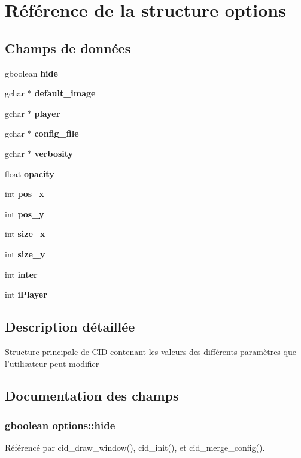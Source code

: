 \section{Référence de la structure options}
\label{structoptions}
\subsection*{Champs de données}
\begin{CompactItemize}
\item 
gboolean {\bf hide}
\item 
gchar $\ast$ {\bf default\_\-image}
\item 
gchar $\ast$ {\bf player}
\item 
gchar $\ast$ {\bf config\_\-file}
\item 
gchar $\ast$ {\bf verbosity}
\item 
float {\bf opacity}
\item 
int {\bf pos\_\-x}
\item 
int {\bf pos\_\-y}
\item 
int {\bf size\_\-x}
\item 
int {\bf size\_\-y}
\item 
int {\bf inter}
\item 
int {\bf iPlayer}
\end{CompactItemize}


\subsection{Description détaillée}
Structure principale de CID contenant les valeurs des différents paramètres que l'utilisateur peut modifier 

\subsection{Documentation des champs}
\subsubsection{\setlength{\rightskip}{0pt plus 5cm}gboolean {\bf options::hide}}\label{structoptions_8c4139bb5b4fd886a183d07ea22e3975}




Référencé par cid\_\-draw\_\-window(), cid\_\-init(), et cid\_\-merge\_\-config().
